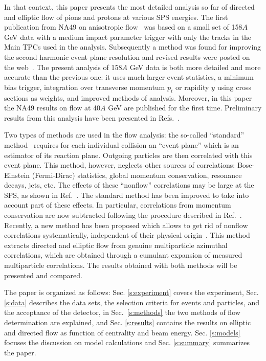 \documentclass[aps,prc,superscriptaddress,showpacs,floatfix,nofootinbib]{revtex4}
\begin{document}
In that context, this paper presents the most detailed analysis so far
of directed and elliptic flow of pions and protons at various SPS
energies.  The first publication from NA49 on anisotropic
flow~\cite{NA49PRL} was based on a small set of 158$A$ GeV data
with a medium impact parameter trigger with only the tracks in the
Main TPCs used in the analysis.  Subsequently a method was found for
improving the second harmonic event plane resolution and revised
results were posted on the web~\cite{NA49Web}.  The present analysis
of 158$A$ GeV data is both more detailed and more accurate than
the previous one: it uses much larger event statistics, a minimum bias
trigger, integration over transverse momentum $p_t$ or rapidity $y$ 
using cross sections as weights, and improved methods of analysis.
Moreover, in this paper the NA49 results on flow at 40$A$ GeV 
are published for the first time.  Preliminary results from this 
analysis have been presented in 
Refs.~\cite{NA49QM99,Wetzler:QM02,Borghini:QM02}.

Two types of methods are used in the flow analysis: the so-called
``standard'' method~\cite{Danielewicz:hn,Ollitrault:1997di,Poskanzer:1998yz}
requires for each individual collision an ``event plane'' which is an
estimator of its reaction plane. Outgoing particles are then
correlated with this event plane.  This method, however, neglects
other sources of correlations: Bose-Einstein (Fermi-Dirac) statistics,
global momentum conservation, resonance decays, jets, etc.  The
effects of these ``nonflow'' correlations may be large at the SPS, as
shown in Ref.~\cite{Dinh:1999mn,Borghini:2000cm}.  The standard method
has been improved to take into account part of these effects. In
particular, correlations from momentum conservation are now subtracted
following the procedure described in Ref.~\cite{Borghini:2002mv}.
Recently, a new method has been proposed which allows to get rid of
nonflow correlations systematically, independent of their physical
origin~\cite{Borghini:2000sa,Borghini:2001vi,Borghini:2002vp}.  This
method extracts directed and elliptic flow from genuine multiparticle
azimuthal correlations, which are obtained through a cumulant
expansion of measured multiparticle correlations.  The results
obtained with both methods will be presented and compared.

The paper is organized as follows: Sec. \ref{s:experiment} covers
the experiment, Sec. \ref{s:data} describes the data sets, the
selection criteria for events and particles, and the acceptance of the
detector, in Sec.~\ref{s:methods} the two methods of flow
determination are explained, and Sec. \ref{s:results} contains the
results on elliptic and directed flow as function of centrality and
beam energy.  Sec. \ref{s:models} focuses the discussion on model
calculations and Sec. \ref{s:summary} summarizes the paper.
\end{document}
